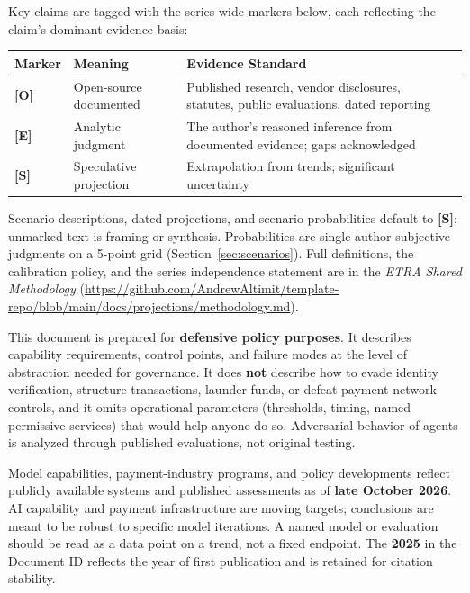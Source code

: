 \documentclass[11pt,letterpaper]{article}
\makeatletter
\newcommand{\etraneed}[1]{\par\if@nobreak\else\penalty\z@\ifdim\pagegoal<\maxdimen\ifdim\dimexpr\pagegoal-\pagetotal\relax<\dimexpr#1\relax\newpage\fi\fi\fi}
\makeatother
\begin{document}
\begin{infobox}
Key claims are tagged with the series-wide markers below, each reflecting the claim's dominant evidence basis:
\begin{center}
\small
\begin{tabularx}{\linewidth}{ZY{0.32}Y{0.98}Y{1.7}}
\toprule
\textbf{Marker} & \textbf{Meaning} & \textbf{Evidence Standard} \\
\midrule
\textbf{[O]} & Open-source documented & Published research, vendor disclosures, statutes, public evaluations, dated reporting \\
\textbf{[E]} & Analytic judgment & The author's reasoned inference from documented evidence; gaps acknowledged \\
\textbf{[S]} & Speculative projection & Extrapolation from trends; significant uncertainty \\
\bottomrule
\end{tabularx}
\end{center}
Scenario descriptions, dated projections, and scenario probabilities default to \textbf{[S]}; unmarked text is framing or synthesis. Probabilities are single-author subjective judgments on a 5-point grid (Section~\ref{sec:scenarios}). Full definitions, the calibration policy, and the series independence statement are in the \textit{ETRA Shared Methodology} (\url{https://github.com/AndrewAltimit/template-repo/blob/main/docs/projections/methodology.md}).
\end{infobox}

\begin{warnbox}
This document is prepared for \textbf{defensive policy purposes}. It describes capability requirements, control points, and failure modes at the level of abstraction needed for governance. It does \textbf{not} describe how to evade identity verification, structure transactions, launder funds, or defeat payment-network controls, and it omits operational parameters (thresholds, timing, named permissive services) that would help anyone do so. Adversarial behavior of agents is analyzed through published evaluations, not original testing.
\end{warnbox}

\etraneed{9\baselineskip}
\begin{infobox}
Model capabilities, payment-industry programs, and policy developments reflect publicly available systems and published assessments as of \textbf{late October 2026}. AI capability and payment infrastructure are moving targets; conclusions are meant to be robust to specific model iterations. A named model or evaluation should be read as a data point on a trend, not a fixed endpoint. The \textbf{2025} in the Document ID reflects the year of first publication and is retained for citation stability.
\end{infobox}
\end{document}

